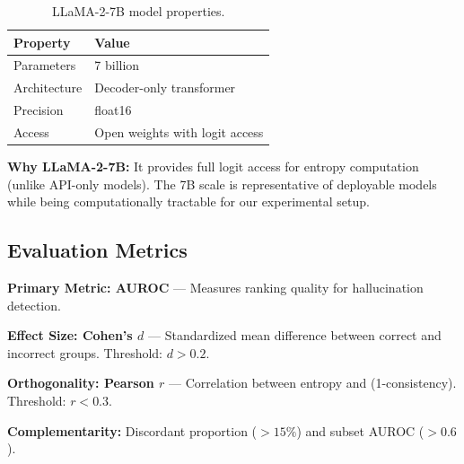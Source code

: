 \begin{table}[h]
\centering
\begin{tabular}{@{}ll@{}}
\toprule
Property & Value \\
\midrule
Parameters & 7 billion \\
Architecture & Decoder-only transformer \\
Precision & float16 \\
Access & Open weights with logit access \\
\bottomrule
\end{tabular}
\caption{LLaMA-2-7B model properties.}
\label{tab:model}
\end{table}

\textbf{Why LLaMA-2-7B:} It provides full logit access for entropy computation (unlike API-only models). The 7B scale is representative of deployable models while being computationally tractable for our experimental setup.

\subsection{Evaluation Metrics}

\textbf{Primary Metric: AUROC} --- Measures ranking quality for hallucination detection.

\textbf{Effect Size: Cohen's $d$} --- Standardized mean difference between correct and incorrect groups. Threshold: $d > 0.2$.

\textbf{Orthogonality: Pearson $r$} --- Correlation between entropy and (1-consistency). Threshold: $r < 0.3$.

\textbf{Complementarity:} Discordant proportion ($>15\%$) and subset AUROC ($>0.6$).
